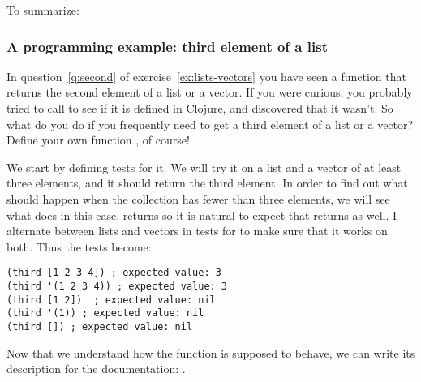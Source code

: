 To summarize: 

\subsubsection{A programming example: third element of a list}\label{subsubsec:third}
In question~\ref{q:second} of exercise~\ref{ex:lists-vectors} you have seen a function  that returns the second element of a list or a vector. If you were curious, you probably tried to call  to see if it is defined in Clojure, and discovered that it wasn't. So what do you do if you frequently need to get a third element of a list or a vector? Define your own function , of course! 

We start by defining tests for it.  
We will try it on a list and a vector of at least three elements, and it should return the third element. 
In order to find out what should happen when the collection has fewer than three elements, we will see what  does in this case.  returns  so it is natural to expect that  returns  as well. I alternate between lists and vectors in tests for  to make sure that it works on both. Thus the tests become:
\begin{framed}
\begin{verbatim}
(third [1 2 3 4]) ; expected value: 3
(third '(1 2 3 4)) ; expected value: 3
(third [1 2])  ; expected value: nil
(third '(1)) ; expected value: nil
(third []) ; expected value: nil
\end{verbatim}
\end{framed}
Now that we understand how the function is supposed to behave, we can write its description for the documentation: . 

